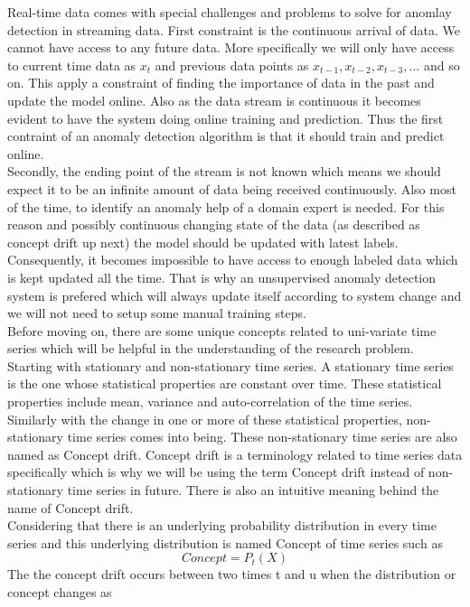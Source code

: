 \documentclass[12pt]{article}
\begin{document}
Real-time data comes with special challenges and problems to solve for anomlay detection in streaming data. First constraint is the continuous arrival of data. 
We cannot have access to any future data. More specifically we will only have access to current time data as $x_t$ and previous data points as $x_{t-1},x_{t-2},x_{t-3},...$ and so on. This apply a constraint of finding the importance of data in the past and update the model online. Also as the data stream is continuous it becomes evident to have the system doing online training and prediction. Thus the first contraint of an anomaly detection algorithm is that it should train and predict online.\\
\break
Secondly, the ending point of the stream is not known which means we should expect it to be an infinite amount of data being received continuously. Also most of the time, to identify an anomaly help of a domain expert is needed. For this reason and possibly continuous changing state of the data (as described as concept drift up next) the model should be updated with latest labels. Consequently, it becomes impossible to have access to enough labeled data which is kept updated all the time. That is why an unsupervised anomaly detection system is prefered which will always update itself according to system change and we will not need to setup some manual training steps.\\
\break
Before moving on, there are some unique concepts related to uni-variate time series which will be helpful in the understanding of the research problem. Starting with stationary and non-stationary time series. A stationary time series is the one whose statistical properties are constant over time. These statistical properties include mean, variance and auto-correlation of the time series. Similarly with the change in one or more of these statistical properties, non-stationary time series comes into being. These non-stationary time series are also named as Concept drift. Concept drift is a terminology related to time series data specifically which is why we will be using the term Concept drift instead of non-stationary time series in future. There is also an intuitive meaning behind the name of Concept drift.\\
\break
Considering that there is an underlying probability distribution in every time series and this underlying distribution is named Concept of time series such as
\begin{equation}
Concept =  P_t(X)
\end{equation} 
The the concept drift occurs between two times t and u when the distribution or concept changes as
\end{document}
